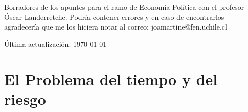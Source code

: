 \documentclass[12pt]{book}
\begin{document}
Borradores de los apuntes para el ramo de Economía Política con el profesor Óscar Landerretche. Podría contener errores y en caso de encontrarlos agradecería que me los hiciera notar al correo: joamartine@fen.uchile.cl

Última actualización: \today 

\newpage

\setcounter{chapter}{3}

\chapter{El Problema del tiempo y del riesgo}



\newpage



\newpage

\begin{appendices}
    
\end{appendices}
\end{document}
